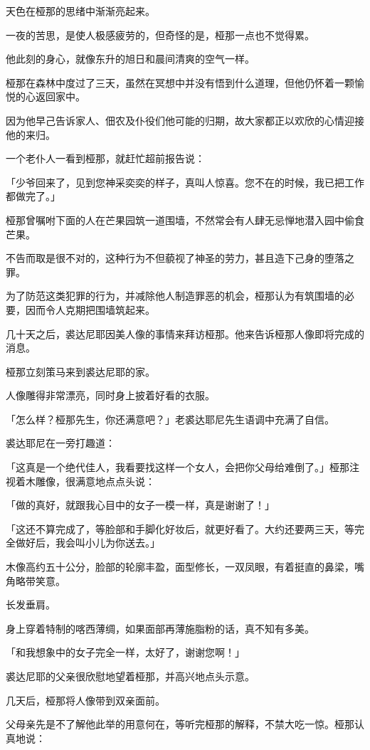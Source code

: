 \documentclass[twoside,openany]{book}
\begin{document}
天色在桠那的思绪中渐渐亮起来。

一夜的苦思，是使人极感疲劳的，但奇怪的是，桠那一点也不觉得累。

他此刻的身心，就像东升的旭日和晨间清爽的空气一样。

桠那在森林中度过了三天，虽然在冥想中并没有悟到什么道理，但他仍怀着一颗愉悦的心返回家中。

因为他早己告诉家人、佃农及仆役们他可能的归期，故大家都正以欢欣的心情迎接他的来归。

一个老仆人一看到桠那，就赶忙超前报告说：

「少爷回来了，见到您神采奕奕的样子，真叫人惊喜。您不在的时候，我已把工作都做完了。」

桠那曾嘱咐下面的人在芒果园筑一道围墙，不然常会有人肆无忌惮地潜入园中偷食芒果。

不告而取是很不对的，这种行为不但藐视了神圣的劳力，甚且造下己身的堕落之罪。

为了防范这类犯罪的行为，并减除他人制造罪恶的机会，桠那认为有筑围墙的必要，因而令人克期把围墙筑起来。

几十天之后，裘达尼耶因美人像的事情来拜访桠那。他来告诉桠那人像即将完成的消息。

桠那立刻策马来到裘达尼耶的家。

人像雕得非常漂亮，同时身上披着好看的衣服。

「怎么样？桠那先生，你还满意吧？」老裘达耶尼先生语调中充满了自信。

裘达耶尼在一旁打趣道：

「这真是一个绝代佳人，我看要找这样一个女人，会把你父母给难倒了。」桠那注视着木雕像，很满意地点点头说：

「做的真好，就跟我心目中的女子一模一样，真是谢谢了！」

「这还不算完成了，等脸部和手脚化好妆后，就更好看了。大约还要两三天，等完全做好后，我会叫小儿为你送去。」

木像高约五十公分，脸部的轮廓丰盈，面型修长，一双凤眼，有着挺直的鼻梁，嘴角略带笑意。

长发垂肩。

身上穿着特制的喀西薄绸，如果面部再薄施脂粉的话，真不知有多美。

「和我想象中的女子完全一样，太好了，谢谢您啊！」

裘达尼耶的父亲很欣慰地望着桠那，并高兴地点头示意。

几天后，桠那将人像带到双亲面前。

父母亲先是不了解他此举的用意何在，等听完桠那的解释，不禁大吃一惊。桠那认真地说：
\end{document}
